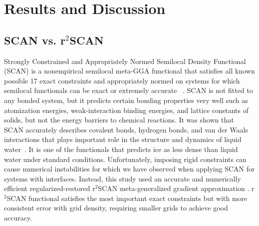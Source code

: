 \chapter{Results and Discussion}

\section{SCAN vs. r$^2$SCAN}
Strongly Constrained and Appropriately Normed Semilocal Density Functional
(SCAN) is  a nonempirical semilocal meta-GGA functional that satisfies all
known possible 17 exact constraints and  appropriately normed on systems for
which semilocal functionals can be exact or extremely accurate
~\cite{sun2015strongly}.  SCAN is not fitted to any bonded system, but it
predicts certain bonding properties very well such as  atomization
energies, weak-interaction binding energies, and lattice
constants of solids, but not the energy barriers to chemical
reactions. It was shown that SCAN accurately describes covalent bonds, hydrogen
bonds, and van der Waals interactions that plays important role in the
structure and dynamics of liquid water~\cite{chen2017ab}. It is one of the
functionals that predicts ice as less dense than liquid water under standard
conditions. Unfortunately,
imposing rigid constraints can cause numerical instabilities for which we have
observed when applying SCAN for systems with interfaces. Instead, this study
used an accurate and numerically efficient regularized-restored r$^2$SCAN
meta-generalized gradient
approximation \cite{Furness2020}. r$^2$SCAN functional satisﬁes the most
important exact constraints but with more consistent error with grid density,
requiring smaller
grids to
achieve good accuracy.

